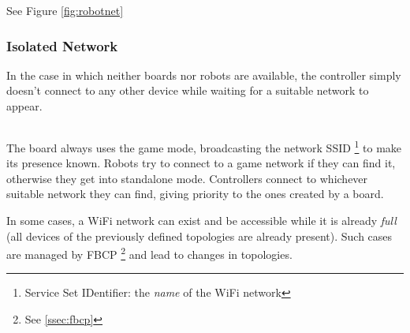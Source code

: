   See Figure \ref{fig:robotnet}

\subsubsection{Isolated Network}
  In the case in which neither boards nor robots are available, the
  controller simply doesn't connect to any other device while
  waiting for a suitable network to appear.

\subsection*{}
The board always uses the game mode, broadcasting the network SSID%
\footnote{Service Set IDentifier: the \textit{name} of the WiFi
network} to make its presence known. Robots try to connect to a game
network if they can find it, otherwise they get into standalone
mode. Controllers connect to whichever suitable network they can
find, giving priority to the ones created by a board.

In some cases, a WiFi network can exist and be accessible while it
is already \textit{full} (all devices of the previously defined
topologies are already present). Such cases are managed by FBCP%
\footnote{See \ref{ssec:fbcp}} and lead to changes in topologies.


